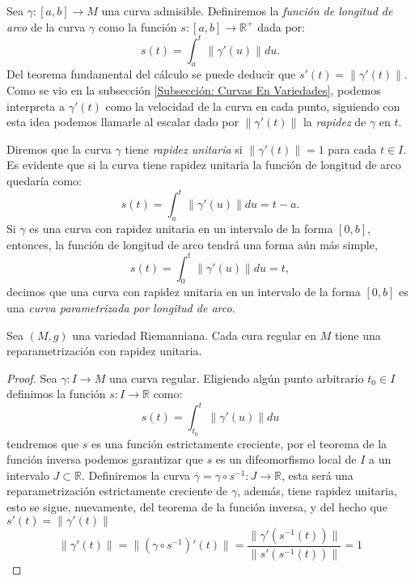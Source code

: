\begin{definition}
	Sea $\gamma: [a,b] \to M$ una curva admisible. Definiremos la \textit{función de longitud de arco} de la curva $\gamma$ como la función $s: [a,b] \to \mathbb{R}^{+}$ dada por:
	\[
		s(t) = \int_{a}^{t} \|\gamma'(u) \| du.
	\]
	Del teorema fundamental del cálculo se puede deducir que $s'(t) = \| \gamma'(t) \|$. Como se vio en la subsección \ref{Subsección: Curvas En Variedades}, podemos interpreta a $\gamma'(t)$ como la velocidad de la curva en cada punto, siguiendo con esta idea podemos llamarle al escalar dado por $\|\gamma'(t)\|$ la \textit{rapidez} de $\gamma$ en $t$.

	Diremos que la curva $\gamma$ tiene \textit{rapidez unitaria} si $\|\gamma'(t)\| = 1$ para cada $t \in I$. Es evidente que si la curva tiene rapidez unitaria la función de longitud de arco quedaría como:
	\[
		s(t) = \int_{a}^{t} \|\gamma'(u)\|du = t - a.
	\]
	Si $\gamma$ es una curva con rapidez unitaria en un intervalo de la forma $[0,b]$, entonces, la función de longitud de arco tendrá una forma aún más simple,
	\[
		s(t) = \int_{0}^{t} \|\gamma'(u)\| du = t,
	\]
	decimos que una curva con rapidez unitaria en un intervalo de la forma $[0,b]$ es una \textit{curva parametrizada por longitud de arco}.
\end{definition}

\begin{lemma}
	Sea $(M,g)$ una variedad Riemanniana. Cada cura regular en $M$ tiene una reparametrización con rapidez unitaria.
\end{lemma}

\begin{proof}
	Sea $\gamma: I \to M$ una curva regular. Eligiendo algún punto arbitrario $t_0 \in I$ definimos la función $s: I \to \mathbb{R}$ como:
	\[
		s(t) = \int_{t_0}^{t} \|\gamma'(u)\|du
	\]
	tendremos que $s$ es una función estrictamente creciente, por el teorema de la función inversa podemos garantizar que $s$ es un difeomorfismo local de $I$ a un intervalo $J \subset \mathbb{R}$. Definiremos la curva $\overline{\gamma} = \gamma \circ s^{-1}: J \to \mathbb{R}$, esta será una reparametrización estrictamente creciente de $\gamma$, además, tiene rapidez unitaria, esto se sigue, nuevamente, del teorema de la función inversa, y del hecho que $s'(t) = \|\gamma'(t)\|$
	\[
		\|\gamma'(t)\| = \|(\gamma \circ s^{-1})'(t)\| = \frac{ \|\gamma'(s^{-1}(t))\| }{\| s'(s^{-1}(t))\| } = 1
	\]
\end{proof}

